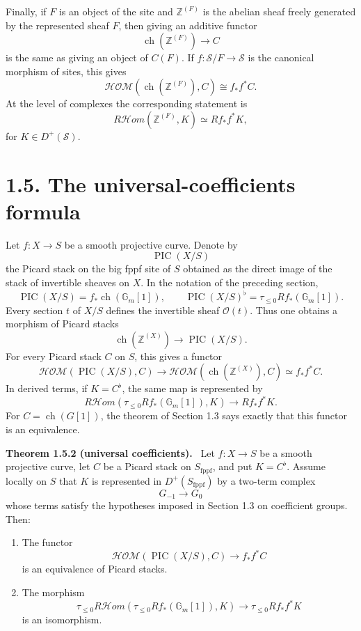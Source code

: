 \documentclass[12pt]{article}
\newcommand{\Ocal}{\mathcal O}
\newcommand{\Ss}{\mathcal S}
\newcommand{\Zz}{\mathbb Z}
\newenvironment{statement}[1]{\par\medskip\noindent\textbf{#1.}\ }{\par\medskip}
\begin{document}
Finally, if \(F\) is an object of the site and \(\Zz^{(F)}\) is the abelian sheaf freely generated by the represented sheaf \(F\), then giving an additive functor
\[
\operatorname{ch}(\Zz^{(F)})\to C
\]
is the same as giving an object of \(C(F)\). If \(f:\Ss/F\to\Ss\) is the canonical morphism of sites, this gives
\[
\mathcal{HOM}(\operatorname{ch}(\Zz^{(F)}),C)
\cong f_*f^*C.
\tag{1.4.24.1}
\]
At the level of complexes the corresponding statement is
\[
R\mathcal{H}om(\Zz^{(F)},K)
\simeq Rf_*f^*K,
\tag{1.4.24.2}
\]
for \(K\in D^+(\Ss)\).

\section*{1.5. The universal-coefficients formula}

Let \(f:X\to S\) be a smooth projective curve. Denote by
\[
\operatorname{PIC}(X/S)
\]
the Picard stack on the big fppf site of \(S\) obtained as the direct image of the stack of invertible sheaves on \(X\). In the notation of the preceding section,
\[
\operatorname{PIC}(X/S)=f_*\operatorname{ch}(\mathbb G_m[1]),
\qquad
\operatorname{PIC}(X/S)^{\flat}
=\tau_{\leq0}Rf_*(\mathbb G_m[1]).
\tag{1.5.1}
\]
Every section \(t\) of \(X/S\) defines the invertible sheaf \(\Ocal(t)\). Thus one obtains a morphism of Picard stacks
\[
\operatorname{ch}(\Zz^{(X)})\longrightarrow \operatorname{PIC}(X/S).
\tag{1.5.1.3}
\]
For every Picard stack \(C\) on \(S\), this gives a functor
\[
\mathcal{HOM}(\operatorname{PIC}(X/S),C)
\longrightarrow
\mathcal{HOM}(\operatorname{ch}(\Zz^{(X)}),C)
\simeq f_*f^*C.
\tag{1.5.1.4}
\]
In derived terms, if \(K=C^{\flat}\), the same map is represented by
\[
R\mathcal{H}om(\tau_{\leq0}Rf_*(\mathbb G_m[1]),K)
\longrightarrow Rf_*f^*K.
\tag{1.5.1.6}
\]
For \(C=\operatorname{ch}(G[1])\), the theorem of Section 1.3 says exactly that this functor is an equivalence.

\begin{statement}{Theorem 1.5.2 \textnormal{(universal coefficients)}}
Let \(f:X\to S\) be a smooth projective curve, let \(C\) be a Picard stack on \(S_{\mathrm{fppf}}\), and put \(K=C^{\flat}\). Assume locally on \(S\) that \(K\) is represented in \(D^+(S_{\mathrm{fppf}})\) by a two-term complex
\[
G_{-1}\to G_0
\]
whose terms satisfy the hypotheses imposed in Section 1.3 on coefficient groups. Then:

\begin{enumerate}[label=\textnormal{(\Roman*)}]
\item The functor
\[
\mathcal{HOM}(\operatorname{PIC}(X/S),C)
\longrightarrow f_*f^*C
\tag{1.5.2.1}
\]
is an equivalence of Picard stacks.

\item The morphism
\[
\tau_{\leq0}R\mathcal{H}om(\tau_{\leq0}Rf_*(\mathbb G_m[1]),K)
\longrightarrow
\tau_{\leq0}Rf_*f^*K
\tag{1.5.2.2}
\]
is an isomorphism.
\end{enumerate}
\end{statement}
\end{document}
